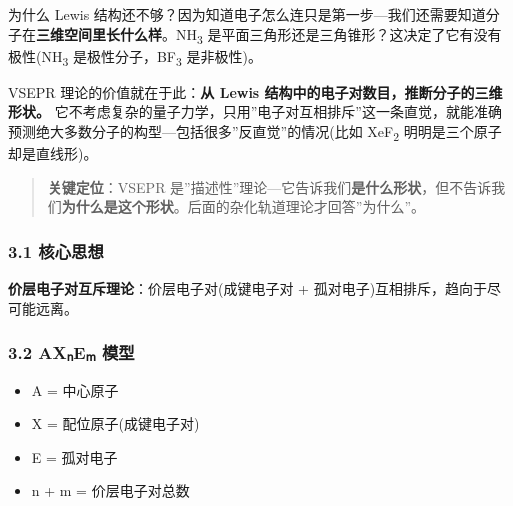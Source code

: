 为什么 Lewis 结构还不够？因为知道电子怎么连只是第一步---我们还需要知道分子在\textbf{三维空间里长什么样}。NH\textsubscript{3} 是平面三角形还是三角锥形？这决定了它有没有极性(NH\textsubscript{3} 是极性分子，BF\textsubscript{3} 是非极性)。

VSEPR 理论的价值就在于此：\textbf{从 Lewis 结构中的电子对数目，推断分子的三维形状。} 它不考虑复杂的量子力学，只用''电子对互相排斥''这一条直觉，就能准确预测绝大多数分子的构型---包括很多''反直觉''的情况(比如 XeF\textsubscript{2} 明明是三个原子却是直线形)。

\begin{quote}
\textbf{关键定位}：VSEPR 是''描述性''理论---它告诉我们\textbf{是什么形状}，但不告诉我们\textbf{为什么是这个形状}。后面的杂化轨道理论才回答''为什么''。
\end{quote}

\subsubsection{3.1 核心思想}\label{ux6838ux5fc3ux601dux60f3}

\textbf{价层电子对互斥理论}：价层电子对(成键电子对 + 孤对电子)互相排斥，趋向于尽可能远离。

\subsubsection{3.2 AXₙEₘ 模型}\label{axux2099eux2098-ux6a21ux578b}

\begin{itemize}
\tightlist
\item
  A = 中心原子
\item
  X = 配位原子(成键电子对)
\item
  E = 孤对电子
\item
  n + m = 价层电子对总数
\end{itemize}

